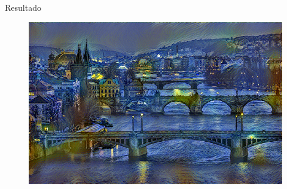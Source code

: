 \documentclass[11pt,usenames, dvipsnames]{beamer}
\begin{document}
\begin{frame}{Resultado}
    \begin{figure}
        \includegraphics[width=\textwidth]{figures/prag_deep}
    \end{figure}
\end{frame}
\end{document}
